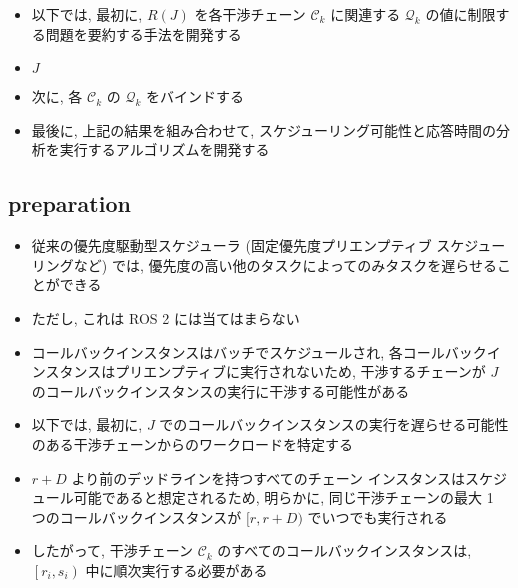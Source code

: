 \begin{frame}{}
    \begin{itemize}
        \item 以下では, 最初に, $R(J)$ を各干渉チェーン $\mathcal{C}_{k}$ に関連する $\mathcal{Q}_{k}$ の値に制限する問題を要約する手法を開発する
        \item $J$
        \item 次に, 各 $\mathcal{C}_{k}$ の $\mathcal{Q}_{k}$ をバインドする
        \item 最後に, 上記の結果を組み合わせて, スケジューリング可能性と応答時間の分析を実行するアルゴリズムを開発する
    \end{itemize}
\end{frame}


\subsection{preparation}
\label{ssec: preparation}

\begin{frame}{}
    \begin{itemize}
        \item 従来の優先度駆動型スケジューラ (固定優先度プリエンプティブ スケジューリングなど) では, 優先度の高い他のタスクによってのみタスクを遅らせることができる
        \item ただし, これは ROS 2 には当てはまらない
        \item コールバックインスタンスはバッチでスケジュールされ, 各コールバックインスタンスはプリエンプティブに実行されないため, 干渉するチェーンが $J$ のコールバックインスタンスの実行に干渉する可能性がある
        \item 以下では, 最初に, $J$ でのコールバックインスタンスの実行を遅らせる可能性のある干渉チェーンからのワークロードを特定する
    \end{itemize}
\end{frame}

\begin{frame}{}
    \begin{itemize}
        \item  $r+D$ より前のデッドラインを持つすべてのチェーン インスタンスはスケジュール可能であると想定されるため, 明らかに, 同じ干渉チェーンの最大 1 つのコールバックインスタンスが $[r, r+D)$ でいつでも実行される
        \item したがって, 干渉チェーン $\mathcal{C}_{k}$ のすべてのコールバックインスタンスは, $\left[r_{i}, s_{i}\right)$ 中に順次実行する必要がある
    \end{itemize}
\end{frame}

